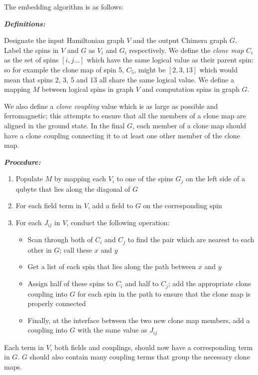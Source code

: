 \documentclass[12pt]{dalthesis}
\begin{document}
The embedding algorithm is as follows:

\emph{\textbf{Definitions:}}

Designate the input Hamiltonian graph $V$ and the output Chimera graph $G$.  Label the spins in $V$ and $G$ as $V_i$ and $G_i$ respectively.
We define the \emph{clone map} $C_i$ as the set of spins $[i,j \ldots]$ which have the same logical value as their parent spin: so for example the clone map of spin 5, $C_5$, might be $[2,3,13]$ which would mean that spins 2, 3, 5 and 13 all share the same logical value.  We define a mapping $M$ between logical spins in graph $V$ and computation spins in graph $G$.  

We also define a \emph{clone coupling} value which is as large as possible and ferromagnetic; this attempts to ensure that all the members of a clone map are aligned in the ground state.  In the final $G$, each member of a clone map should have a clone coupling connecting it to at least one other member of the clone map.

\emph{\textbf{Procedure:}}
\begin{enumerate}
	\item Populate $M$ by mapping each $V_i$ to one of the spins $G_j$ on the left side of a qubyte that lies along the diagonal of $G$
	\item For each field term in $V$, add a field to $G$ on the corresponding spin
	\item For each $J_{ij}$ in $V$, conduct the following operation:
		\begin{itemize}
			\item Scan through both of $C_i$ and $C_j$ to find the pair which are nearest to each other in $G$; call these $x$ and $y$
			\item Get a list of each spin that lies along the path between $x$ and $y$
			\item Assign half of these spins to $C_i$ and half to $C_j$; add the appropriate clone coupling into $G$ for each spin in the path to ensure that the clone map is properly connected
			\item Finally, at the interface between the two new clone map members, add a coupling into $G$ with the same value as $J_{ij}$
		\end{itemize}
\end{enumerate}

Each term in $V$, both fields and couplings, should now have a corresponding term in $G$.  $G$ should also contain many coupling terms that group the necessary clone maps.
\end{document}
